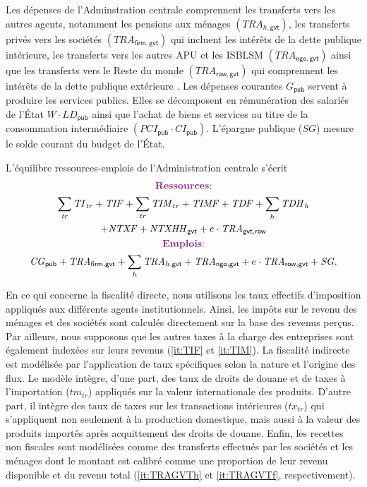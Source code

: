 \documentclass[11pt,a4paper]{article}
\newcommand{\gvt}{\mathsf{gvt}}
\newcommand{\firm}{\mathsf{firm}}
\newcommand{\ngo}{\mathsf{ngo}}
\newcommand{\row}{\mathsf{row}}
\newcommand{\CI}{\mathit{CI}}
\newcommand{\CG}{\mathit{CG}}
\newcommand{\NTXHH}{\mathit{NTXHH}}
\newcommand{\LD}{\mathit{LD}}
\newcommand{\SG}{\mathit{SG}}
\newcommand{\TI}{\mathit{TI}}
\newcommand{\TIF}{\mathit{TIF}}
\newcommand{\TIM}{\mathit{TIM}}
\newcommand{\TIMF}{\mathit{TIMF}}
\newcommand{\PCI}{\mathit{PCI}}
\newcommand{\TRA}{\mathit{TRA}}
\newcommand{\pub}{\mathsf{pub}}
\newcommand{\TR}{\mathit{TRA}}
\newcommand{\tr}{\mathit{tr}}
\newcommand{\tx}{\mathit{tx}}
\newcommand{\tm}{\mathit{tm}}
\newcommand{\NTXF}{\mathit{NTXF}}
\newcommand{\TDH}{\mathit{TDH}}
\newcommand{\TDF}{\mathit{TDF}}
\begin{document}
	Les dépenses de l'Adminstration centrale comprennent les transferts vers les autres agents, notamment les pensions aux ménages $\left(\TRA_{h,\gvt}\right)$, les transferts privés vers les sociétés $\left(\TRA_{\firm,\gvt}\right)$ qui incluent les intérêts de la dette publique intérieure, les transferts vers les autres APU et les ISBLSM $\left(\TRA_{\ngo,\gvt}\right)$ ainsi que les transferts vers le Reste du monde $\left(\TRA_{\row,\gvt}\right)$ qui comprennent les intérêts de la dette publique extérieure . Les dépenses courantes $G_{\pub}$ servent à produire les services publics. Elles se décomposent en rémunération des salariés de l'État $W\cdot\LD_{\pub}$ ainsi que l'achat de biens et services au titre de la consommation intermédiaire $\left(\PCI_{\pub}\cdot\CI_{\pub}\right)$. L'épargne publique ($\SG$) mesure le solde courant du budget de l'État.
	
	L'équilibre ressources-emplois de l'Administration centrale s'écrit		
	\begin{gather}
		\centerline{\textcolor{Fuchsia}{\textbf{Ressources}:}} \notag\\
		\sum_{\tr}\TI_{\tr} + \TIF + \sum_{\tr}\TIM_{tr} + \TIMF + \TDF +  \sum_{h} \TDH_h\notag\\
		+ \NTXF + \NTXHH_{\gvt} + e\cdot \TR_{\gvt,\row}\notag\\
		\centerline{\textcolor{Fuchsia}{\textbf{Emplois}:}} \notag\\
		\CG_{\pub} + \TR_{\firm,\gvt}  + \sum_{h}\TR_{h,\gvt} + \TR_{\ngo,\gvt} + e\cdot\TR_{\row,\gvt} + \SG.\notag
	\end{gather}
	
	En ce qui concerne la fiscalité directe, nous utilisons les taux effectifs d'imposition appliqués aux différents agents institutionnels. Ainsi, les impôts sur le revenu des ménages et des sociétés sont calculés directement sur la base des revenus perçus. Par ailleurs, nous supposons que les autres taxes à la charge des entreprises sont également indexées sur leurs revenus (\ref{it:TIF} et \ref{it:TIM}). La fiscalité indirecte est modélisée par l'application de taux spécifiques selon la nature et l'origine des flux. Le modèle intègre, d'une part, des taux de droits de douane et de taxes à l'importation ($\tm_{\tr}$) appliqués sur la valeur internationale des produits. D'autre part, il intègre des taux de taxes sur les transactions intérieures ($\tx_{\tr}$) qui s'appliquent non seulement à la production domestique, mais aussi à la valeur des produits importés après acquittement des droits de douane. Enfin, les recettes non fiscales sont modélisées comme des transferts effectués par les sociétés et les ménages dont le montant est calibré comme une proportion de leur revenu disponible et du revenu total (\ref{it:TRAGVTh} et \ref{it:TRAGVTf}, respectivement).
	
\end{document}
